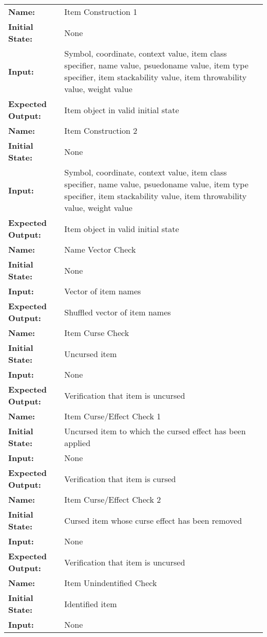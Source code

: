 \documentclass[12pt, titlepage]{article}
\begin{document}
\begin{center}
\begin{longtable}{ l | l }
\hline
\textbf{Name:} & Item Construction 1\\
\textbf{Initial State:} & None\\
\textbf{Input:} & Symbol, coordinate, context value, item class specifier, name value, psuedoname value, item type specifier, item stackability value, item throwability value, weight value\\
\textbf{Expected Output:} & Item object in valid initial state\\
\textbf{Name:} & Item Construction 2\\
\textbf{Initial State:} & None\\
\textbf{Input:} & Symbol, coordinate, context value, item class specifier, name value, psuedoname value, item type specifier, item stackability value, item throwability value, weight value\\
\textbf{Expected Output:} & Item object in valid initial state\\
\hline
\textbf{Name:} & Name Vector Check\\
\textbf{Initial State:} & None\\
\textbf{Input:} & Vector of item names\\
\textbf{Expected Output:} & Shuffled vector of item names\\
\hline
\textbf{Name:} & Item Curse Check\\
\textbf{Initial State:} & Uncursed item\\
\textbf{Input:} & None\\
\textbf{Expected Output:} & Verification that item is uncursed\\
\hline
\textbf{Name:} & Item Curse/Effect Check 1\\
\textbf{Initial State:} & Uncursed item to which the cursed effect has been applied\\
\textbf{Input:} & None\\
\textbf{Expected Output:} & Verification that item is cursed\\
\hline
\textbf{Name:} & Item Curse/Effect Check 2\\
\textbf{Initial State:} & Cursed item whose curse effect has been removed\\
\textbf{Input:} & None\\
\textbf{Expected Output:} & Verification that item is uncursed\\
\hline
\textbf{Name:} & Item Unindentified Check\\
\textbf{Initial State:} & Identified item\\
\textbf{Input:} & None\\

\end{longtable}
\end{center}
\end{document}
